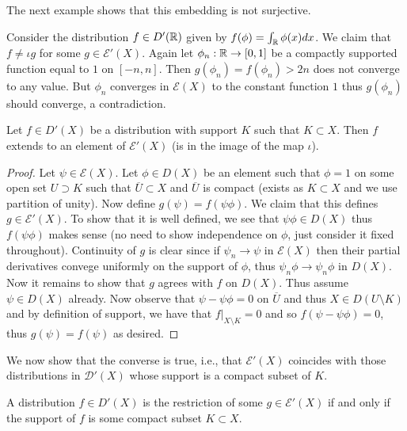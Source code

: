\documentclass[twoside, a4paper, 10pt]{amsart}
\begin{document}
The next example shows that this embedding is not surjective.

\begin{eg} Consider the distribution $f \in D'(\mathbb{R})$ given by $f(\phi) = \int_{\mathbb{R}} \phi(x) dx $. We claim that $f \neq \iota g$ for some $g \in \mathcal{E}'(X)$. Again let $\phi_n:\mathbb{R} \to [0,1]$ be a compactly supported function equal to $1$ on $[-n,n]$. Then $g(\phi_n) = f(\phi_n) > 2n$ does not converge to any value. But $\phi_n$ converges in $\mathcal{E}(X)$ to the constant function $1$ thus $g(\phi_n)$ should converge, a contradiction. 

\end{eg}

\begin{lemma} Let $f \in D'(X)$ be a distribution with support $K$ such that $K \subset X$. Then $f$ extends to an element of $\mathcal{E}'(X)$ (is in the image of the map $\iota$).

\end{lemma}

\begin{proof} Let $\psi \in \mathcal{E}(X)$. Let $\phi \in D(X)$ be an element such that $\phi = 1$ on some open set $U \supset K$ such that $\overline{U} \subset X$ and $\overline{U}$ is compact (exists as $K \subset X$ and we use partition of unity). Now define $g(\psi) = f(\psi \phi)$. We claim that this defines $g \in \mathcal{E}'(X)$. To show that it is well defined, we see that $\psi \phi \in D(X)$ thus $f(\psi \phi)$ makes sense (no need to show independence on $\phi$, just consider it fixed throughout). Continuity of $g$ is clear since if $\psi_n \to \psi$ in $\mathcal{E}(X)$ then their partial derivatives convege uniformly on the support of $\phi$, thus $\psi_n\phi \to \psi_n \phi$ in $D(X)$. Now it remains to show that $g$ agrees with $f$ on $D(X)$. Thus assume $\psi \in D(X)$ already. Now observe that $\psi - \psi\phi = 0$ on $\overline{U}$ and thus $X \in D(U \setminus K)$  and by definition of support, we have that $f|_{X \setminus K} = 0$ and so $f(\psi - \psi \phi) = 0$, thus $g(\psi) = f(\psi)$ as desired.\end{proof}

We now show that the converse is true, i.e., that $\mathcal{E}'(X)$ coincides with those distributions in $\mathcal{D}'(X)$ whose support is a compact subset of $K$.

\begin{thm} A distribution $f \in D'(X)$ is the restriction of some $g \in \mathcal{E}'(X)$ if and only if the support of $f$ is some compact subset $K \subset X$. 

\end{thm}
\end{document}
